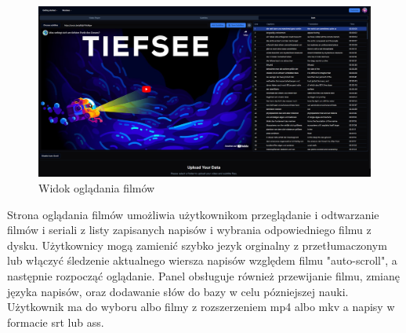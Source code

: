 \begin{figure}[H]
    \centering
    \includegraphics[width=1\textwidth]{IMAGE/videoPlayer.png}
    \caption{Widok oglądania filmów}
    \label{fig:oglądanie filmów}
\end{figure}

Strona oglądania filmów umożliwia użytkownikom przeglądanie i odtwarzanie filmów i seriali z listy zapisanych napisów i wybrania odpowiedniego filmu z dysku. Użytkownicy mogą zamienić szybko jezyk orginalny z przetłumaczonym lub włączyć śledzenie aktualnego wiersza napisów względem filmu "auto-scroll", a następnie rozpocząć oglądanie. Panel obsługuje również przewijanie filmu, zmianę języka napisów, oraz dodawanie słów do bazy w celu pózniejszej nauki. Użytkownik ma do wyboru albo filmy z rozszerzeniem mp4 albo mkv a napisy w formacie srt lub ass.

